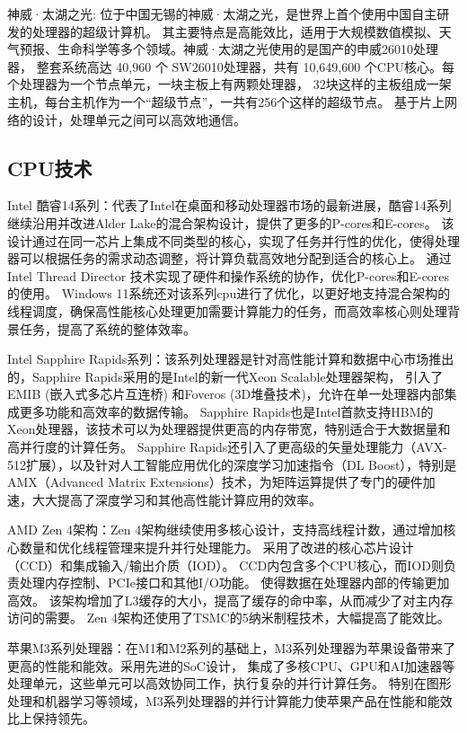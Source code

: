 \documentclass{ctexart}
\begin{document}
神威·太湖之光: 位于中国无锡的神威·太湖之光，是世界上首个使用中国自主研发的处理器的超级计算机。
其主要特点是高能效比，适用于大规模数值模拟、天气预报、生命科学等多个领域。神威·太湖之光使用的是国产的申威26010处理器，
整套系统高达 40,960 个 SW26010处理器，共有 10,649,600 个CPU核心。每个处理器为一个节点单元，一块主板上有两颗处理器，
32块这样的主板组成一架主机，每台主机作为一个“超级节点”，一共有256个这样的超级节点。 \cite{china93petaflop}
基于片上网络的设计，处理单元之间可以高效地通信。
\subsection{CPU技术}
Intel 酷睿14系列：代表了Intel在桌面和移动处理器市场的最新进展，酷睿14系列继续沿用并改进Alder Lake的混合架构设计，提供了更多的P-cores和E-cores。
该设计通过在同一芯片上集成不同类型的核心，实现了任务并行性的优化，使得处理器可以根据任务的需求动态调整，将计算负载高效地分配到适合的核心上。
通过 Intel Thread Director 技术实现了硬件和操作系统的协作，优化P-cores和E-cores的使用。
Windows 11系统还对该系列cpu进行了优化，以更好地支持混合架构的线程调度，确保高性能核心处理更加需要计算能力的任务，而高效率核心则处理背景任务，提高了系统的整体效率。\cite{intelOfficial}

Intel Sapphire Rapids系列：该系列处理器是针对高性能计算和数据中心市场推出的，Sapphire Rapids采用的是Intel的新一代Xeon Scalable处理器架构，
引入了EMIB (嵌入式多芯片互连桥) 和Foveros (3D堆叠技术)，允许在单一处理器内部集成更多功能和高效率的数据传输。
Sapphire Rapids也是Intel首款支持HBM的Xeon处理器，该技术可以为处理器提供更高的内存带宽，特别适合于大数据量和高并行度的计算任务。
Sapphire Rapids还引入了更高级的矢量处理能力（AVX-512扩展），以及针对人工智能应用优化的深度学习加速指令（DL Boost），特别是AMX（Advanced Matrix Extensions）技术，为矩阵运算提供了专门的硬件加速，大大提高了深度学习和其他高性能计算应用的效率。
\cite{intelOfficial}

AMD Zen 4架构：Zen 4架构继续使用多核心设计，支持高线程计数，通过增加核心数量和优化线程管理来提升并行处理能力。
采用了改进的核心芯片设计（CCD）和集成输入/输出介质（IOD）。
CCD内包含多个CPU核心，而IOD则负责处理内存控制、PCIe接口和其他I/O功能。
使得数据在处理器内部的传输更加高效。
该架构增加了L3缓存的大小，提高了缓存的命中率，从而减少了对主内存访问的需要。
Zen 4架构还使用了TSMC的5纳米制程技术，大幅提高了能效比。\cite{amdOfficial}

苹果M3系列处理器：在M1和M2系列的基础上，M3系列处理器为苹果设备带来了更高的性能和能效。采用先进的SoC设计，
集成了多核CPU、GPU和AI加速器等处理单元，这些单元可以高效协同工作，执行复杂的并行计算任务。
特别在图形处理和机器学习等领域，M3系列处理器的并行计算能力使苹果产品在性能和能效比上保持领先。
\end{document}
